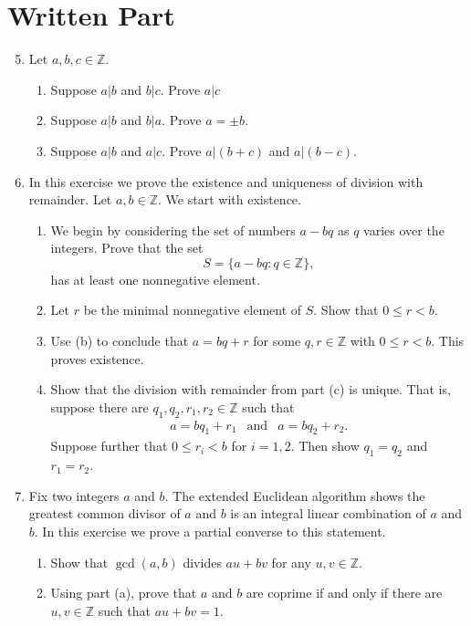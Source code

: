 \documentclass[11pt]{article}
\newcommand{\bZ}{\mathbb{Z}}
\begin{document}
\section*{Written Part}
\begin{enumerate}
  \setcounter{enumi}{4}
  \item{
  Let $a,b,c\in\bZ$.
  \begin{enumerate}
    \item{
    Suppose $a|b$ and $b|c$.  Prove $a|c$
    }
    \item{
    Suppose $a|b$ and $b|a$.  Prove $a=\pm b$.
    }
    \item{
    Suppose $a|b$ and $a|c$.  Prove $a|(b+c)$ and $a|(b-c)$.
    }
  \end{enumerate}
  }
  \item{
  In this exercise we prove the existence and uniqueness of division with remainder.  Let $a,b\in\bZ$.  We start with existence.
  \begin{enumerate}
    \item{
    We begin by considering the set of numbers $a-bq$ as $q$ varies over the integers.  Prove that the set
    \[S = \{a-bq : q\in\bZ\},\]
    has at least one nonnegative element.
    }
    \item{
    Let $r$ be the minimal nonnegative element of $S$.  Show that $0\le r< b$.
    }
    \item{
    Use (b) to conclude that $a = bq+r$ for some $q,r\in\bZ$ with $0\le r<b$.  This proves existence.
    }
    \item{
    Show that the division with remainder from part (c) is unique.  That is, suppose there are $q_1,q_2,r_1,r_2\in\bZ$ such that
    \begin{eqnarray*}
      a = bq_1+r_1 &\text{and}&a= bq_2+r_2.
    \end{eqnarray*}
    Suppose further that $0\le r_i< b$ for $i=1,2$.  Then show $q_1=q_2$ and $r_1=r_2$.
    }
  \end{enumerate}
  }
  \item{
  Fix two integers $a$ and $b$.  The extended Euclidean algorithm shows the greatest common divisor of $a$ and $b$ is an integral linear combination of $a$ and $b$.  In this exercise we prove a partial converse to this statement.
  \begin{enumerate}
    \item{
    Show that $\gcd(a,b)$ divides $au+bv$ for any $u,v\in\bZ$.
    }
    \item{
    Using part (a), prove that $a$ and $b$ are coprime if and only if there are $u,v\in\bZ$ such that $au+bv=1$.
}
\end{enumerate}}
\end{enumerate}
\end{document}
